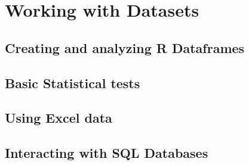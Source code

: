 \section{Working with Datasets}
\subsection{Creating and analyzing R Dataframes}

\subsection{Basic Statistical tests}

\subsection{Using Excel data}
\subsection{Interacting with SQL Databases}
\endinput

